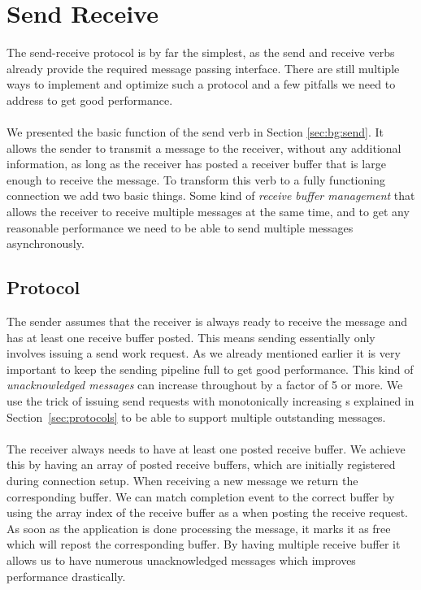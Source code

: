 \section{Send Receive} \label{sec:conn:send}\label{sendrcv}\label{sendrcv-design}

The send-receive protocol is by far the simplest, as the send and receive verbs already provide the required 
message passing interface. There are still multiple ways to implement and optimize such a protocol and a few pitfalls 
we need to address to get good performance.

\paragraph{} We presented the basic function of the send verb in Section \ref{sec:bg:send}. It allows the sender to transmit 
a message to the receiver, without any additional information, as long as the receiver has posted a receiver buffer that is 
large enough to receive the message. To transform this verb to a fully functioning connection we add two basic things. 
Some kind of \emph{receive buffer management} that allows the receiver to receive multiple messages at the same time, 
and to get any reasonable performance we need to be able to send multiple messages asynchronously.

\subsection{Protocol} 

The sender assumes that the receiver is always ready to receive the message and has at least one receive buffer 
posted. This means sending essentially only involves issuing a send work request. As we already mentioned earlier it is very 
important to keep the sending pipeline full to get good performance.  This kind of \emph{unacknowledged messages} can increase
throughout by a factor of 5 or more.
We use the trick of issuing send requests with monotonically increasing s explained in Section~\ref{sec:protocols}
to be able to support multiple 
outstanding messages.

\paragraph{} The receiver always needs to have at least one posted receive buffer. We achieve this by having an array of 
posted receive buffers, which are initially registered during connection setup. When receiving a new message we return 
the corresponding buffer. We can match completion event to the correct buffer by using the array index of the receive 
buffer as a  when posting the receive request. As soon as the application is done processing the message,
it marks it as free which will repost the corresponding buffer. By having multiple receive buffer it allows us to have 
numerous unacknowledged messages which improves performance drastically.

